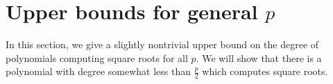 \documentclass{article}
\newcommand{\F}{\mathbb{F}}
\begin{document}

\section{Upper bounds for general $p$}


In this section, we give a slightly nontrivial upper bound on the degree of polynomials computing square roots for all $p$.
We will show that there is a polynomial with degree somewhat less than $\frac{p}{2}$ which computes square roots.
\end{document}

